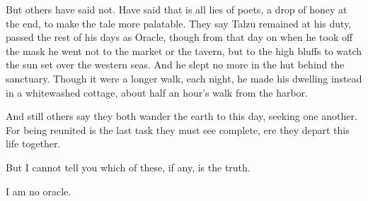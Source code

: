 But others have said not. Have said that is all lies of poets, a drop of honey at the end, to make the tale more palatable. They say Talzu remained at his duty, passed the rest of his days as Oracle, though from that day on when he took off the mask he went not to the market or the tavern, but to the high bluffs to watch the sun set over the western seas. And he slept no more in the hut behind the sanctuary. Though it were a longer walk, each night, he made his dwelling instead in a whitewashed cottage, about half an hour's walk from the harbor.

And still others say they both wander the earth to this day, seeking one another. For being reunited is the last task they must see complete, ere they depart this life together.

But I cannot tell you which of these, if any, is the truth.

I am no oracle.
